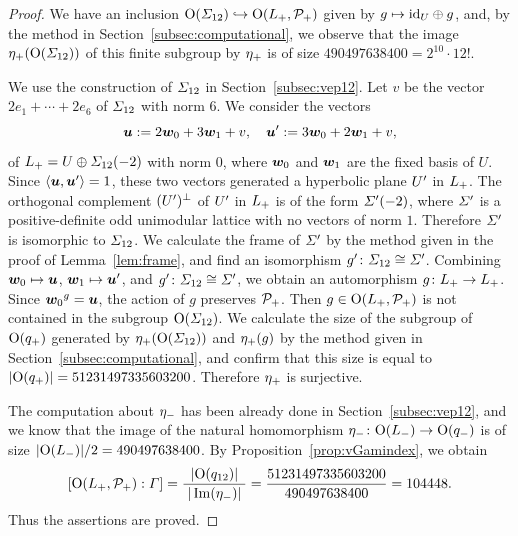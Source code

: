 \documentclass{amsart} %
\begin{document}
\begin{proof}
We have an inclusion $\mathord{\mathrm{O}}(\varSigma_{12})\hookrightarrow \mathord{\mathrm{O}}(L_{+}, \mathord{\mathcal{P}}_{+})$
given by $g\mapsto \mathord{\mathrm{id}}_{U}\oplus g$,
and, by the method in Section~\ref{subsec:computational}, 
we observe that  
 the image ${\eta}_{+}(\mathord{\mathrm{O}}(\varSigma_{12}))$ of this finite subgroup %
by ${\eta}_{+}$ is 
of size $490497638400=2^{10}\cdot 12!$.
 \par
 We use the construction of $\varSigma_{12}$ in Section~\ref{subsec:vep12}.
 Let $v$ be the vector $2e_1+\cdots +2e_6$ of $\varSigma_{12}$ with norm $6$.
 We consider the vectors
 \[
 \boldsymbol{u}:=2\boldsymbol{w}_0+ 3\boldsymbol{w}_1+v,
 \quad 
 \boldsymbol{u}^{\prime}:=3\boldsymbol{w}_0+ 2\boldsymbol{w}_1+v,
 \]
 of $L_{+}=U\oplus \varSigma_{12}(-2)$ with norm $0$,
 where $\boldsymbol{w}_0$ and $\boldsymbol{w}_1$ are the fixed basis of $U$. 
Since 
$\langle \boldsymbol{u}, \boldsymbol{u}^{\prime} \rangle=1$, these two vectors 
generated a hyperbolic plane $U^{\prime}$ in $L_{+}$.
 The orthogonal complement $(U^{\prime})^{\perp}$ of $U^{\prime}$ in $L_{+}$
 is of the form $\varSigma^{\prime}(-2)$,
where $\varSigma^{\prime}$ is a positive-definite odd unimodular lattice
with no vectors of norm $1$.
Therefore $\varSigma^{\prime}$ is isomorphic to $\varSigma_{12}$.
We calculate the frame of $\varSigma^{\prime}$ 
by the method given in the proof of Lemma~\ref{lem:frame},
and find an isomorphism $g^{\prime} \colon \varSigma_{12}\cong \varSigma^{\prime}$.
Combining $\boldsymbol{w}_0\mapsto \boldsymbol{u}$, $\boldsymbol{w}_1\mapsto \boldsymbol{u}^{\prime}$,
and $g^{\prime} \colon \varSigma_{12}\cong \varSigma^{\prime}$,
we obtain an automorphism $g\colon L_{+}\to L_{+}$.
Since ${\boldsymbol{w}_0}^g= \boldsymbol{u}$, 
the action of $g$ preserves $\mathord{\mathcal{P}}_{+}$.
Then $g\in \mathord{\mathrm{O}}(L_{+}, \mathord{\mathcal{P}}_{+})$
 is not contained in the subgroup $\mathord{\mathrm{O}}(\varSigma_{12})$.
We calculate the size of the subgroup of $\mathord{\mathrm{O}}(q_{+})$
generated by ${\eta}_{+}(\mathord{\mathrm{O}}(\varSigma_{12}))$ and ${\eta}_{+} (g)$
by the method given in Section~\ref{subsec:computational}, 
and confirm that 
this size is equal to $|\mathord{\mathrm{O}}(q_{+})|=51231497335603200$.
Therefore ${\eta}_{+}$ is surjective.
%
\par
The computation about ${\eta}_{-}$ has been already done in 
Section~\ref{subsec:vep12},
and we know that the image of 
the natural homomorphism 
${\eta}_{-}\colon \mathord{\mathrm{O}}(L_{-}) \to \mathord{\mathrm{O}}(q_{-})$
is of size 
$|\mathord{\mathrm{O}}(L_{-})|/2=490497638400$.
By Proposition~\ref{prop:vGamindex},
we obtain  
\[
[\mathord{\mathrm{O}}(L_{+}, \mathord{\mathcal{P}}_{+}): \varGamma]
= \frac{ |\mathord{\mathrm{O}}(q_{12})|}{\; |\operatorname{Im}({\eta}_{-})|\;}
=
\frac{51231497335603200}{490497638400}
=
104448.
\]
Thus the assertions are proved.
\end{proof}
\end{document}
